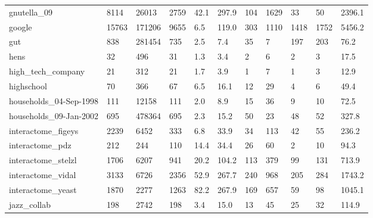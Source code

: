 \begin{longtable}{lllllllllll}
 gnutella\_09                                        & 8114       & 26013     & 2759  & 42.1   & 297.9  & 104   & 1629   & 33     & 50     & 2396.1  \\
 google                                             & 15763      & 171206    & 9655  & 6.5    & 119.0  & 303   & 1110   & 1418   & 1752   & 5456.2  \\
 gut                                                & 838        & 281454    & 735   & 2.5    & 7.4    & 35    & 7      & 197    & 203    & 76.2    \\
 hens                                               & 32         & 496       & 31    & 1.3    & 3.4    & 2     & 6      & 2      & 3      & 17.5    \\
 high\_tech\_company                                  & 21         & 312       & 21    & 1.7    & 3.9    & 1     & 7      & 1      & 3      & 12.9    \\
 highschool                                         & 70         & 366       & 67    & 6.5    & 16.1   & 12    & 29     & 4      & 6      & 49.4    \\
 households\_04-Sep-1998                             & 111        & 12158     & 111   & 2.0    & 8.9    & 15    & 36     & 9      & 10     & 72.5    \\
 households\_09-Jan-2002                             & 695        & 478364    & 695   & 2.3    & 15.2   & 50    & 23     & 48     & 52     & 327.8   \\
 interactome\_figeys                                 & 2239       & 6452      & 333   & 6.8    & 33.9   & 34    & 113    & 42     & 55     & 236.2   \\
 interactome\_pdz                                    & 212        & 244       & 110   & 14.4   & 34.4   & 26    & 60     & 2      & 10     & 94.3    \\
 interactome\_stelzl                                 & 1706       & 6207      & 941   & 20.2   & 104.2  & 113   & 379    & 99     & 131    & 713.9   \\
 interactome\_vidal                                  & 3133       & 6726      & 2356  & 52.9   & 267.7  & 240   & 968    & 205    & 284    & 1743.2  \\
 interactome\_yeast                                  & 1870       & 2277      & 1263  & 82.2   & 267.9  & 169   & 657    & 59     & 98     & 1045.1  \\
 jazz\_collab                                        & 198        & 2742      & 198   & 3.4    & 15.0   & 13    & 45     & 25     & 32     & 114.9   \\

\end{longtable}
